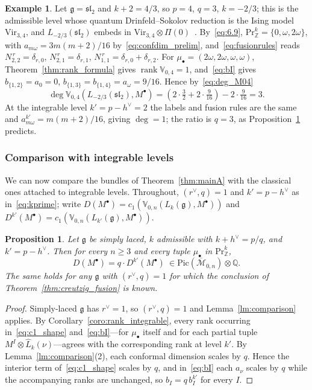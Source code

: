 \documentclass[12pt,a4paper,reqno]{amsart}
\numberwithin{equation}{section}
\newtheorem{proposition}[theorem]{Proposition}
\theoremstyle{definition}
\newtheorem{example}[theorem]{Example}
\newcommand{\g}{\mathfrak{g}}
\renewcommand{\sl}{\mathfrak{sl}}
\newcommand{\rk}{\operatorname{rank}}
\newcommand{\Z}{\mathbb{Z}}
\newcommand{\Q}{\mathbb{Q}}
\newcommand{\M}{\mathcal{M}}
\def\Pr{\mathrm{Pr}}
\def\om{\omega}
\def\o{\otimes}
\def\VV{\mathbb{V}}
\begin{document}
\begin{example}\label{ex:sl2deg}
Let $\g=\sl_2$ and $k+2=4/3$, so $p=4$, $q=3$, $k=-2/3$; this is the admissible level whose quantum Drinfeld--Sokolov reduction is the Ising model $\mathrm{Vir}_{3,4}$, and $L_{-2/3}(\sl_2)$ embeds in $\mathrm{Vir}_{3,4}\o\Pi(0)$~\cite{Adamovic19}. By~\eqref{eq:6.9}, $\Pr^k_\Z=\{0,\om,2\om\}$, with $a_{m\om}=3m(m+2)/16$ by~\eqref{eq:confdim_prelim}, and~\eqref{eq:fusionrules} reads $N_{2,2}^{\,r}=\delta_{r,0}$, $N_{2,1}^{\,r}=\delta_{r,1}$, $N_{1,1}^{\,r}=\delta_{r,0}+\delta_{r,2}$. For $\mu_\bullet=(2\om,2\om,\om,\om)$, Theorem~\ref{thm:rank_formula} gives $\rk\VV_{0,4}=1$, and~\eqref{eq:bI} gives $b_{\{1,2\}}=a_0=0$, $b_{\{1,3\}}=b_{\{1,4\}}=a_\om=9/16$. Hence by~\eqref{eq:deg_M04}
\[
\deg \VV_{0,4}(L_{-2/3}(\sl_2),M^\bullet)=\left(2\cdot\tfrac{3}{2}+2\cdot\tfrac{9}{16}\right)-2\cdot\tfrac{9}{16}=3.
\]
At the integrable level $k'=p-h^\vee=2$ the labels and fusion rules are the same and $a^{k'}_{m\om}=m(m+2)/16$, giving $\deg=1$; the ratio is $q=3$, as Proposition~\ref{prop:qscaling} predicts.
\end{example}

\subsubsection{Comparison with integrable levels}\label{subsubsec:comparison}

We can now compare the bundles of Theorem~\ref{thm:mainA} with the classical ones attached to integrable levels. Throughout, $(r^\vee,q)=1$ and $k'=p-h^\vee$ as in~\eqref{eq:kprime}; write $D(M^\bullet)=c_1(\VV_{0,n}(L_k(\g),M^\bullet))$ and $D^{k'}(M^\bullet)=c_1(\VV_{0,n}(L_{k'}(\g),M^\bullet))$.

\begin{proposition}\label{prop:qscaling}
Let $\g$ be simply laced, $k$ admissible with $k+h^\vee=p/q$, and $k'=p-h^\vee$. Then for every $n\geq 3$ and every tuple $\mu_\bullet$ in $\Pr^k_\Z$,
\begin{equation}\label{eq:qscaling}
D(M^\bullet)=q\cdot D^{k'}(M^\bullet)\ \in \mathrm{Pic}(\overline{\M}_{0,n})\o \Q.
\end{equation}
The same holds for any $\g$ with $(r^\vee,q)=1$ for which the conclusion of Theorem~\ref{thm:creutzig_fusion} is known.
\end{proposition}
\begin{proof}
Simply-laced $\g$ has $r^\vee=1$, so $(r^\vee,q)=1$ and Lemma~\ref{lm:comparison} applies. By Corollary~\ref{coro:rank_integrable}, every rank occurring in~\eqref{eq:c1_shape} and~\eqref{eq:bI}---for $\mu_\bullet$ itself and for each partial tuple $M^I\o \hat{L}_k(\nu)$---agrees with the corresponding rank at level $k'$. By Lemma~\ref{lm:comparison}(2), each conformal dimension scales by $q$. Hence the interior term of~\eqref{eq:c1_shape} scales by $q$, and in~\eqref{eq:bI} each $a_\nu$ scales by $q$ while the accompanying ranks are unchanged, so $b_I=q\,b^{k'}_I$ for every $I$.
\end{proof}
\end{document}
